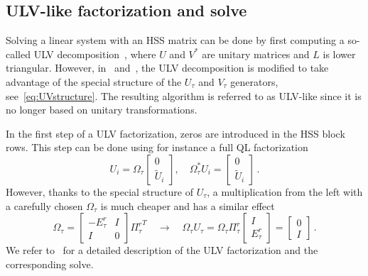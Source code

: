 \documentclass{article}
\begin{document}
\subsection{ULV-like factorization and solve}\label{sec:ULV}
Solving a linear system with an HSS matrix can be done by first
computing a so-called ULV decomposition~\cite{chandrasekaran2006fast},
where $U$ and $V^*$ are unitary matrices and $L$ is lower
triangular. However, in~\cite{xia2013randomized}
and~\cite{xia2012superfast}, the ULV decomposition is modified to take
advantage of the special structure of the $U_\tau$ and $V_\tau$
generators, see~\eqref{eq:UVstructure}. The resulting algorithm is
referred to as ULV-like since it is no longer based on unitary
transformations.

In the first step of a ULV factorization, zeros are introduced in the
HSS block rows. This step can be done using for instance a full QL
factorization
\begin{equation}
  U_i = \Omega_{\tau} \begin{bmatrix} 0 \\ \tilde{U}_i \end{bmatrix}, \quad
  \Omega_{\tau}^* U_i = \begin{bmatrix} 0 \\ \tilde{U}_i \end{bmatrix} \, .
\end{equation}
However, thanks to the special structure of $U_\tau$, a multiplication
from the left with a carefully chosen $\Omega_\tau$ is much cheaper
and has a similar effect
\begin{equation}
  \Omega_\tau = \begin{bmatrix} -E^r_\tau & I \\ I & 0 \end{bmatrix} {\Pi_\tau^r}^T \quad \rightarrow \quad 
  \Omega_\tau U_\tau = \Omega_{\tau} \Pi^r_\tau \begin{bmatrix} I \\ E^r_\tau\end{bmatrix} = 
\begin{bmatrix} 0 \\ I \end{bmatrix} \, .
\end{equation}
We refer to~\cite{FHR} for a detailed description of the ULV
factorization and the corresponding solve.
\end{document}
